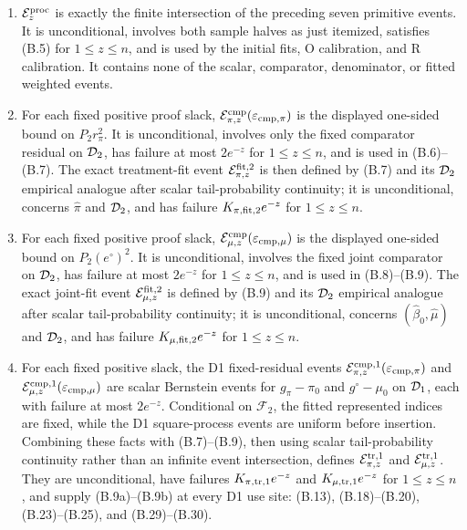 \begin{enumerate}
\item \(\mathcal E_z^{\rm proc}\) is exactly the finite intersection of
the preceding seven primitive events.  It is unconditional, involves both
sample halves as just itemized, satisfies (B.5) for \(1\le z\le n\), and
is used by the initial fits, O calibration, and R calibration.  It contains
none of the scalar, comparator, denominator, or fitted weighted events.

\item For each fixed positive proof slack,
\(\mathcal E_{\pi,z}^{\rm cmp}(\varepsilon_{\rm cmp,\pi})\) is the
displayed one-sided bound on \(P_2r_\pi^2\).  It is unconditional, involves
only the fixed comparator residual on \(\mathcal D_2\), has failure at most
\(2e^{-z}\) for \(1\le z\le n\), and is used in (B.6)--(B.7).
The exact treatment-fit event \(\mathcal E_{\pi,z}^{\rm fit,2}\) is then
defined by (B.7) and its \(\mathcal D_2\) empirical analogue after scalar
tail-probability continuity; it is unconditional, concerns
\(\widehat\pi\) and \(\mathcal D_2\), and has failure
\(K_{\pi,\rm fit,2}e^{-z}\) for \(1\le z\le n\).

\item For each fixed positive proof slack,
\(\mathcal E_{\mu,z}^{\rm cmp}(\varepsilon_{\rm cmp,\mu})\) is the
displayed one-sided bound on \(P_2(e^\circ)^2\).  It is unconditional,
involves the fixed joint comparator on \(\mathcal D_2\), has failure at most
\(2e^{-z}\) for \(1\le z\le n\), and is used in (B.8)--(B.9).
The exact joint-fit event \(\mathcal E_{\mu,z}^{\rm fit,2}\) is defined by
(B.9) and its \(\mathcal D_2\) empirical analogue after scalar tail-probability
continuity; it is unconditional, concerns
\((\widehat\beta_0,\widehat\mu)\) and \(\mathcal D_2\), and has failure
\(K_{\mu,\rm fit,2}e^{-z}\) for \(1\le z\le n\).

\item For each fixed positive slack, the D1 fixed-residual events
\(\mathcal E_{\pi,z}^{\rm cmp,1}(\varepsilon_{\rm cmp,\pi})\) and
\(\mathcal E_{\mu,z}^{\rm cmp,1}(\varepsilon_{\rm cmp,\mu})\) are scalar
Bernstein events for \(g_\pi-\pi_0\) and \(g^\circ-\mu_0\) on
\(\mathcal D_1\), each with failure at most \(2e^{-z}\).  Conditional on
\(\mathcal F_2\), the fitted represented indices are fixed, while the D1
square-process events are uniform before insertion.  Combining these facts
with (B.7)--(B.9), then using scalar tail-probability continuity rather than
an infinite event intersection, defines
\(\mathcal E_{\pi,z}^{\rm tr,1}\) and
\(\mathcal E_{\mu,z}^{\rm tr,1}\).  They are unconditional, have failures
\(K_{\pi,\rm tr,1}e^{-z}\) and \(K_{\mu,\rm tr,1}e^{-z}\) for
\(1\le z\le n\), and supply (B.9a)--(B.9b) at every D1 use site:
(B.13), (B.18)--(B.20), (B.23)--(B.25), and (B.29)--(B.30).


\end{enumerate}
